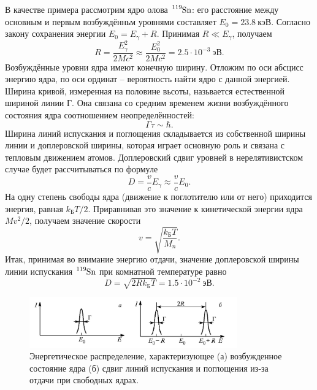 \documentclass[a4paper,12pt]{article}
\theoremstyle{definition}
\begin{document}
В качестве примера рассмотрим ядро олова $\ce{^119Sn}$: его расстояние между основным и первым возбуждённьм уровнями составляет $E_{0}=23.8~\text{кэВ}$. Согласно закону сохранения энергии $E_{0}=E_{\gamma}+R$. Принимая $R \ll E_{\gamma}$, получаем
$$
R=\dfrac{E_\gamma^2}{2 M c^2} \approx \dfrac{E_0^2}{2 M c^2}=2.5 \cdot 10^{-3}~\text{эВ}.
$$
Возбуждённые уровни ядра имеют конечную ширину. Отложим по оси абсцисс энергию ядра, по оси ординат -- вероятность найти ядро с данной энергией. Ширина кривой, измеренная на половине вьсоты, назьвается естественной шириной линии Г. Она связана
со средним временем жизни возбуждённого состояния ядра соотношением
неопределённостей:
$$
\Gamma \tau \sim \hbar.
$$
Ширина линий испускания и поглощения складывается из собственной ширины линии и доплеровской ширины, которая играет основную роль и связана с тепловым движением атомов. Доплеровский сдвиг уровней в нерелятивистском случае будет рассчитываться по формуле
$$
D = \frac{v}{c} E_{\gamma} \approx \frac{v}{c} E_0.
$$
На одну степень свободы ядра (движение к поглотителю или от него) приходится энергия, равная $k_\text{Б}T/2$. Приравнивая это значение к кинетической энергии ядра $Mv^2/2$, получаем значение скорости
$$
v = \sqrt{\dfrac{k_\text{Б}T}{M_n}}.
$$
Итак, принимая во внимание энергию отдачи, значение доплеровской ширины линии испускания $\ce{^119Sn}$ при комнатной температуре равно
$$
D = \sqrt{2Rk_\text{Б}T} = 1.5 \cdot 10^{-2}~\text{эВ}.
$$
\begin{figure}[h!]
\begin{center}
\includegraphics[width=0.8\textwidth]{1}
\caption{Энергетическое распределение, характеризующее (а) возбужденное состояние ядра (б) сдвиг линий испускания и поглощения из-за отдачи при свободных ядрах.}
\end{center}
\end{figure}
\end{document}
